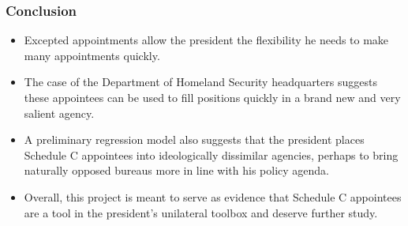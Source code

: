\documentclass{beamer}
\begin{document}
\begin{frame}[fragile]
\frametitle{Conclusion}
\begin{itemize}\addtolength{\itemsep}{1\baselineskip}
\item Excepted appointments allow the president the flexibility he needs to make many appointments quickly.
\item The case of the Department of Homeland Security headquarters suggests these appointees can be used to fill positions quickly in a brand new and very salient agency.
\item A preliminary regression model also suggests that the president places Schedule C appointees into ideologically dissimilar agencies, perhaps to bring naturally opposed bureaus more in line with his policy agenda.
\item Overall, this project is meant to serve as evidence that Schedule C appointees are a tool in the president's unilateral toolbox and deserve further study.
\end{itemize}
\end{frame}
\end{document}
